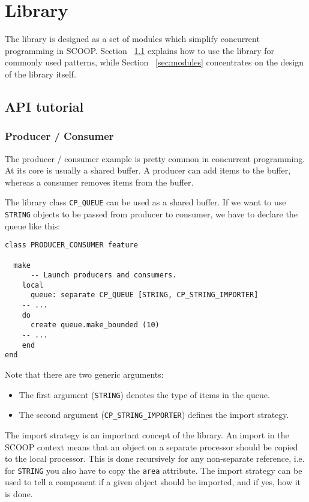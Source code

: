 \documentclass[a4paper,10pt]{report}
\begin{document}
\section {Library}

The library is designed as a set of modules which simplify concurrent programming in SCOOP.
Section ~\ref{sec:tutorial} explains how to use the library for commonly used patterns,
while Section ~\ref{sec:modules} concentrates on the design of the library itself.

\subsection {API tutorial}
\label{sec:tutorial}

\subsubsection{Producer / Consumer}

The producer / consumer example is pretty common in concurrent programming.
At its core is usually a shared buffer.
A producer can add items to the buffer, whereas a consumer removes items from the buffer.

The library class \lstinline!CP_QUEUE! can be used as a shared buffer.
If we want to use \lstinline!STRING! objects to be passed from producer to consumer, we have to declare the queue like this:

\begin{lstlisting}
class PRODUCER_CONSUMER feature

  make
      -- Launch producers and consumers.
    local
      queue: separate CP_QUEUE [STRING, CP_STRING_IMPORTER]
	-- ...
    do
      create queue.make_bounded (10)
	-- ...
    end
end
\end{lstlisting}

Note that there are two generic arguments:
\begin{itemize}
\item The first argument (\lstinline!STRING!) denotes the type of items in the queue.
\item The second argument (\lstinline!CP_STRING_IMPORTER!) defines the import strategy.
\end{itemize}

The import strategy is an important concept of the library.
An import in the SCOOP context means that an object on a separate processor should be copied to the local processor.
This is done recursively for any non-separate reference, i.e. for  \lstinline!STRING! you also have to copy the \lstinline!area! attribute.
The import strategy can be used to tell a component if a given object should be imported, and if yes, how it is done.
\end{document}
